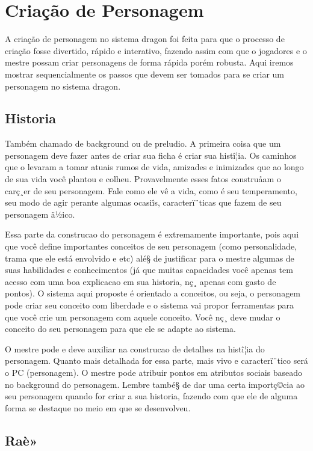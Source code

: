 

\chapter{Criação de Personagem}
\label{Cap:cdp}


A criação de personagem no sistema dragon foi feita para que o processo de criação fosse divertido, rápido e interativo, fazendo assim com que o jogadores e o mestre possam criar personagens de forma rápida porém robusta. Aqui iremos mostrar sequencialmente os passos que devem ser tomados para se criar um personagem no sistema dragon.


\section{Historia}
 Também chamado de background ou de preludio. A primeira coisa que um personagem deve fazer antes de criar sua ficha é criar sua histî¦ia. Os caminhos que o levaram a tomar atuais rumos de vida, amizades e inimizades que ao longo de sua vida você plantou e colheu. Provavelmente esses fatos construåam o carç¸er de seu personagem. Fale como ele vê a vida, como é seu temperamento, seu modo de agir perante algumas ocasiîs, caracterï¨ticas que fazem de seu personagem ä½ico.

Essa parte da construcao do personagem é extremamente importante, pois aqui que você define importantes conceitos de seu personagem (como personalidade, trama que ele está envolvido e etc) alé§ de justificar para o mestre algumas de suas habilidades e conhecimentos (já que muitas capacidades você apenas tem acesso com uma boa explicacao em sua historia, nç¸ apenas com gasto de pontos). O sistema aqui proposte é orientado a conceitos, ou seja, o personagem pode criar seu conceito com liberdade e o sistema vai propor ferramentas para que você crie um personagem com aquele conceito. Você nç¸ deve mudar o conceito do seu personagem para que ele se adapte ao sistema.

O mestre pode e deve auxiliar na construcao de detalhes na histî¦ia do personagem. Quanto mais detalhada for essa parte, mais vivo e caracterï¨tico será o PC (personagem). O mestre pode atribuir pontos em atributos sociais baseado no background do personagem. Lembre també§ de dar uma certa importç©cia ao seu personagem quando for criar a sua historia, fazendo com que ele de alguma forma se destaque no meio em que se desenvolveu. 


\section{Raè»}

